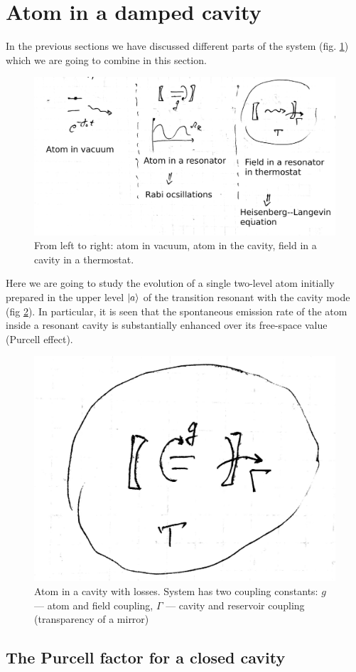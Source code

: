 \section{Atom in a damped cavity}

In the previous sections we have discussed different parts of the system (fig. \ref{fig:before}) which we are going to combine in this section.

\begin{figure}[h!]
	\centering
	\includegraphics[width=0.7\linewidth]{fig/L10/before}
	\caption{From left to right: atom in vacuum, atom in the cavity, field in a cavity in a thermostat.}
	\label{fig:before}
\end{figure}


Here we are going to study the evolution of a single two-level atom initially prepared in the upper level $\left\lvert {a} \right\rangle$ of the transition resonant with the cavity mode (fig \ref{fig:atominr}). In particular, it is seen that the spontaneous emission rate of the atom inside a resonant cavity is substantially enhanced over its free-space value (Purcell effect).

\begin{figure}[h!]
	\centering
	\includegraphics[width=0.3\linewidth]{fig/L10/atom_in_R}
	\caption{Atom in a cavity with losses. System has two coupling constants: $g$ --- atom and field coupling, $\Gamma$ --- cavity and reservoir coupling (transparency of a mirror)}
	\label{fig:atominr}
\end{figure}

\subsection{The Purcell factor for a closed cavity}

